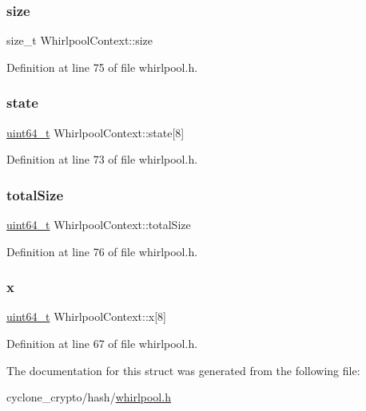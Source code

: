 \subsubsection{\texorpdfstring{size}{size}}
{\footnotesize\ttfamily size\+\_\+t Whirlpool\+Context\+::size}



Definition at line 75 of file whirlpool.\+h.

\mbox{\label{structWhirlpoolContext_a5618839a2d02bf3e1282290f8d79a353}} 
\subsubsection{\texorpdfstring{state}{state}}
{\footnotesize\ttfamily \hyperlink{stdint_8h_aec6fcb673ff035718c238c8c9d544c47}{uint64\+\_\+t} Whirlpool\+Context\+::state\mbox{[}8\mbox{]}}



Definition at line 73 of file whirlpool.\+h.

\mbox{\label{structWhirlpoolContext_a5723d1b91fce5cb012b66bc21d626a43}} 
\subsubsection{\texorpdfstring{total\+Size}{totalSize}}
{\footnotesize\ttfamily \hyperlink{stdint_8h_aec6fcb673ff035718c238c8c9d544c47}{uint64\+\_\+t} Whirlpool\+Context\+::total\+Size}



Definition at line 76 of file whirlpool.\+h.

\mbox{\label{structWhirlpoolContext_a31944f1f23b15f9c15db3b17d1c07eb4}} 
\subsubsection{\texorpdfstring{x}{x}}
{\footnotesize\ttfamily \hyperlink{stdint_8h_aec6fcb673ff035718c238c8c9d544c47}{uint64\+\_\+t} Whirlpool\+Context\+::x\mbox{[}8\mbox{]}}



Definition at line 67 of file whirlpool.\+h.



The documentation for this struct was generated from the following file\+:\begin{DoxyCompactItemize}
\item 
cyclone\+\_\+crypto/hash/\hyperlink{whirlpool_8h}{whirlpool.\+h}\end{DoxyCompactItemize}
